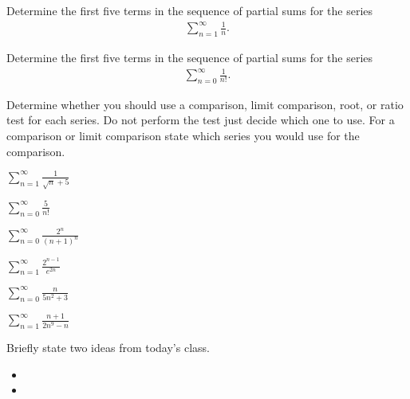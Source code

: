 \begin{problem}
  \item Determine the first five terms in the sequence of partial sums for the series
  \begin{eqnarray*}
    \sum^\infty_{n=1} \frac{1}{n}.
  \end{eqnarray*}
  \vfill

  \item Determine the first five terms in the sequence of partial sums for the series
  \begin{eqnarray*}
    \sum^\infty_{n=0} \frac{1}{n!}.
  \end{eqnarray*}
  \vfill

  \clearpage

\item Determine whether you should use a comparison, limit comparison,
  root, or ratio test for each series. Do not perform the test just decide
  which one to use. For a comparison or limit comparison state which
  series you would use for the comparison.
  \begin{subproblem}
    \item $\sum_{n=1}^\infty \frac{1}{\sqrt{n}+5}$
      \vfill
    \item $\sum_{n=0}^\infty \frac{5}{n!}$
      \vfill
    \item $\sum_{n=0}^\infty \frac{2^n}{(n+1)^n} $
      \vfill
      \clearpage
    \item $\sum_{n=1}^\infty \frac{2^{n-1}}{e^{2n}}$
      \vfill
    \item $\sum_{n=0}^\infty \frac{n}{5n^2+3} $
      \vfill
    \item $\sum_{n=1}^\infty \frac{n+1}{2n^9-n}$
      \vfill
  \end{subproblem}
\end{problem}


\postClass

\begin{problem}
\item Briefly state two ideas from today's class.
  \begin{itemize}
  \item
  \item
  \end{itemize}
\item
  \begin{subproblem}
    \item
  \end{subproblem}
\end{problem}



